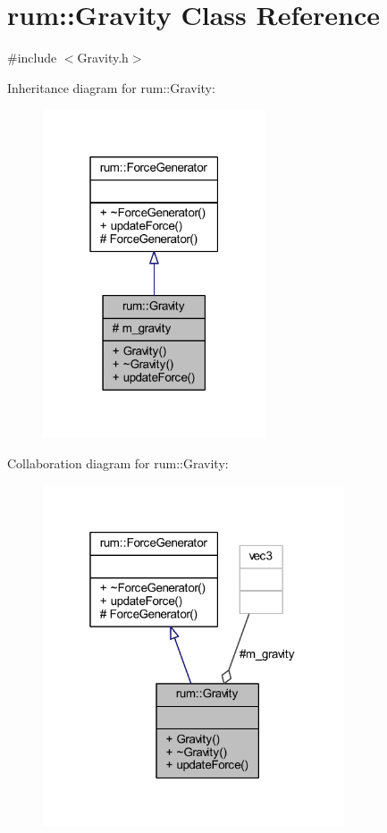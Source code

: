 \hypertarget{classrum_1_1_gravity}{}\section{rum\+:\+:Gravity Class Reference}
\label{classrum_1_1_gravity}


{\ttfamily \#include $<$Gravity.\+h$>$}



Inheritance diagram for rum\+:\+:Gravity\+:\nopagebreak
\begin{figure}[H]
\begin{center}
\leavevmode
\includegraphics[width=187pt]{classrum_1_1_gravity__inherit__graph}
\end{center}
\end{figure}


Collaboration diagram for rum\+:\+:Gravity\+:\nopagebreak
\begin{figure}[H]
\begin{center}
\leavevmode
\includegraphics[width=253pt]{classrum_1_1_gravity__coll__graph}
\end{center}
\end{figure}
